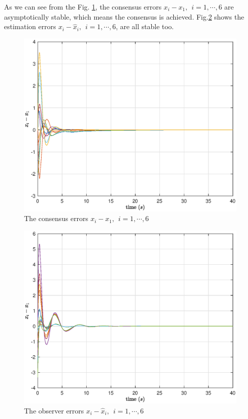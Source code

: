\documentclass[english]{cccconf}
\begin{document}
As we can see from the Fig. \ref{cpic}, the consensus errors $x_i-x_1,~~i=1,\cdots, 6$
are asymptotically stable, which means the consensus is achieved. Fig.\ref{epic} shows the estimation errors $x_i-\hat x_i,~~i=1,\cdots, 6$, are all stable too.

\begin{figure}[!htb]
  \centering
  \includegraphics[width=\hsize]{figures/consensus_errors.eps}
  \caption{The consensus errors $x_i-x_1,~~i=1,\cdots, 6$}
  \label{cpic}
\end{figure} 


\begin{figure}[!htb]
  \centering
  \includegraphics[width=\hsize]{figures/estimation_errors.eps}
  \caption{The observer errors $x_i-\hat x_i,~~i=1,\cdots, 6$}
  \label{epic}
\end{figure}
\end{document}
